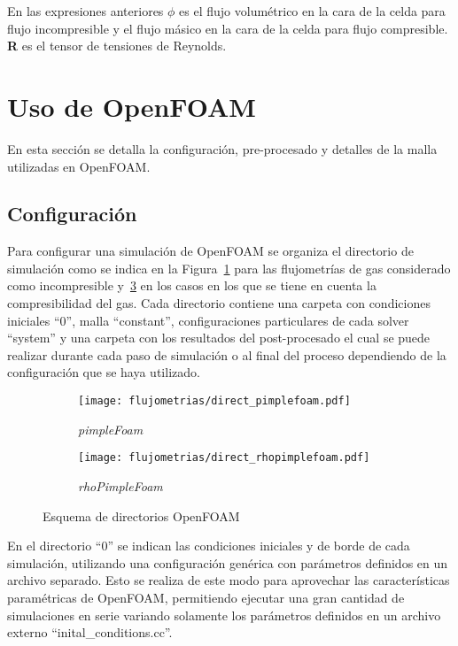 En las expresiones anteriores $\phi$ es el flujo volumétrico en la cara de la celda para flujo
incompresible y el flujo másico en la cara de la celda para flujo compresible.
%
\textbf{R} es el tensor de tensiones de Reynolds.

\section{Uso de OpenFOAM}

En esta sección se detalla la configuración, pre-procesado y detalles de la
malla utilizadas en OpenFOAM.

\subsection{Configuración}
%
Para configurar una simulación de OpenFOAM se organiza el directorio de
simulación como se indica en la Figura~\ref{fig:direc_pf} para las flujometrías
de gas considerado como incompresible  y~\ref{fig:direc_rpf} en los casos en
los que se tiene en cuenta la compresibilidad del gas.
%
Cada directorio contiene una carpeta con condiciones iniciales ``0'', malla
``constant'', configuraciones particulares de cada solver ``system'' y una
carpeta con los resultados del post-procesado el cual se puede realizar
durante cada paso de simulación o al final del proceso dependiendo de la
configuración que se haya utilizado.

\begin{figure}[h!]
  \centering
  \begin{subfigure}[b]{0.4\textwidth}
    \centering
    \texttt{[image: flujometrias/direct\_pimplefoam.pdf]}
    \caption{\emph{pimpleFoam}\label{fig:direc_pf} }
  \end{subfigure}%
  \begin{subfigure}[b]{0.4\textwidth}
    \centering
    \texttt{[image: flujometrias/direct\_rhopimplefoam.pdf]}
    \caption{\emph{rhoPimpleFoam}\label{fig:direc_rpf} }
  \end{subfigure}
  \caption{Esquema de directorios OpenFOAM}
\end{figure}


En el directorio ``0'' se indican las condiciones iniciales y de borde de cada
simulación, utilizando una configuración genérica con parámetros definidos en un
archivo separado.
%
Esto se realiza de este modo para aprovechar las características paramétricas de
OpenFOAM, permitiendo ejecutar una gran cantidad de simulaciones en serie
variando solamente los parámetros definidos en un archivo externo
``inital\_conditions.cc''.

